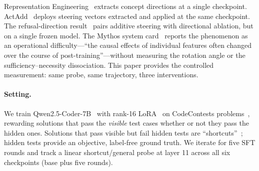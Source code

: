 \documentclass[11pt]{article}
\begin{document}
Representation Engineering~\citep{zou2023representation} extracts concept directions at
a single checkpoint. ActAdd~\citep{turner2023activation} deploys
steering vectors extracted and applied at the same checkpoint. The
refusal-direction result~\citep{arditi2024refusal} pairs additive
steering with directional ablation, but on a single frozen model. The
Mythos system card~\citep{anthropic2026mythos} reports the phenomenon as
an operational difficulty---``the causal effects of individual features
often changed over the course of post-training''---without measuring the
rotation angle or the sufficiency--necessity dissociation. This paper
provides the controlled measurement: same probe, same trajectory, three
interventions.

\paragraph{Setting.} We train Qwen2.5-Coder-7B~\citep{qwen2024coder}
with rank-16 LoRA~\citep{hu2021lora} on CodeContests
problems~\citep{li2022codecontests}, rewarding solutions that pass the
\emph{visible} test cases whether or not they pass the hidden ones.
Solutions that pass visible but fail hidden tests are
``shortcuts''~\citep{geirhos2020shortcut}; hidden tests provide an
objective, label-free ground truth. We iterate for five SFT rounds and
track a linear shortcut/general probe at layer 11 across all six
checkpoints (base plus five rounds).
\end{document}
